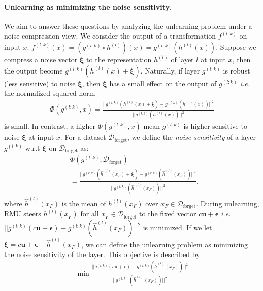 \documentclass[letterpaper]{article} %
\begin{document}
\paragraph{Unlearning as minimizing the noise sensitivity.} We aim to answer these questions by analyzing the unlearning problem under a noise compression view. We consider the output of a transformation $f^{(l:k)}$ on input $x$: $f^{(l:k)}(x) = (g^{(l:k)} \circ h^{(l)})(x) = g^{(l:k)} \left(h^{(l)}(x)\right)$. Suppose we compress a noise vector $\bm \xi$ to the representation $h^{(l)}$ of layer $l$ at input $x$, then the output become $g^{(l:k)} \left(h^{(l)}(x) + \bm \xi\right)$. Naturally, if layer $g^{(l:k)}$ is robust (less sensitive) to noise $\bm \xi$, then $\bm \xi$ has a small effect on the output of $g^{(l:k)}$ \textit{i.e.} the normalized squared norm 
\begin{align}
        \Phi(g^{(l:k)}, x) = \frac{||g^{(l:k)}\left(h^{(l)}(x)+ \bm\xi\right) - g^{(l:k)} \left(h^{(l)}(x)\right)||^2}{||g^{(l:k)} \left(h^{(l)}(x)\right)||^2}
    \end{align}
is small. In contrast, a higher $\Phi(g^{(l:k)},x)$ mean $g^{(l:k)}$ is higher sensitive to noise $\bm \xi$ at input $x$. For a dataset $\mathcal{D}_{\text{forget}}$, we define the \textit{noise sensitivity} of a layer $g^{(l:k)}$ w.r.t $\bm\xi$ on $\mathcal{D}_{\text{forget}}$ as:
\begin{align}
        &\Phi(g^{(l:k)}, \mathcal{D}_{\text{forget}}) \nonumber\\&=\frac{||g^{(l:k)}(\hat{h}^{(l)}(x_F)+ \bm\xi) - g^{(l:k)} (\hat h^{(l)}(x_F))||^2}{||g^{(l:k)} (\hat h^{(l)}(x_F))||^2},
    \end{align}
    where $\hat h^{(l)}(x_F)$ is the mean of $h^{(l)}(x_F)$ over $x_F\in \mathcal{D}_{\text{forget}}$.
During unlearning, RMU steers $h^{(l)}(x_F)$ for all $x_F\in \mathcal{D}_{\text{forget}}$ to the fixed vector $c\bm u + \bm\epsilon$ \textit{i.e.} $||g^{(l:k)}(c\bm u + \bm \epsilon) - g^{(l:k)}(\hat h^{(l)}(x_F))||^2$ is minimized. If we let $\bm \xi = c \bm u + \bm \epsilon- \hat h^{(l)}(x_F)$, we can define the unlearning problem as minimizing the noise sensitivity of the layer. This objective is described by
\begin{align}
\min \frac{||g^{(l:k)}(c\bm u +\bm\epsilon) - g^{(l:k)} (\hat h^{(l)}(x_F))||^2}{||g^{(l:k)} (\hat h^{(l)}(x_F))||^2}
\end{align}
\end{document}
